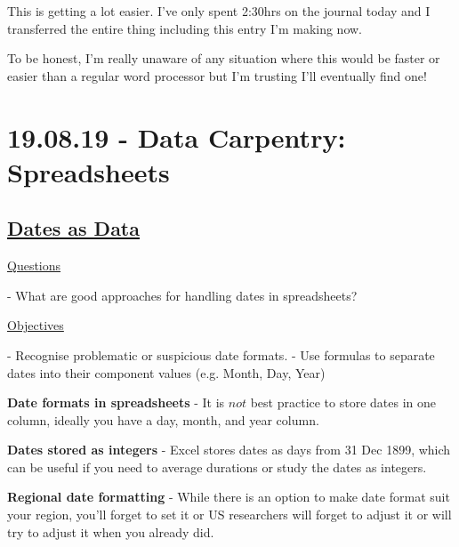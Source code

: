 \documentclass[12pt]{article}
\begin{document}
This is getting a lot easier. I've only spent 2:30hrs on the journal today and I transferred the entire thing including this entry I'm making now.

To be honest, I'm really unaware of any situation where this would be faster or easier than a regular word processor but I'm trusting I'll eventually find one!

\newpage\section{19.08.19 - Data Carpentry: Spreadsheets}

\subsection{\href{https://datacarpentry.org/spreadsheets-socialsci/03-dates-as-data/index.html}{\textbf{Dates as Data}}}

\color{gray}
\underline{Questions}

- What are good approaches for handling dates in spreadsheets?

\underline{Objectives}

- Recognise problematic or suspicious date formats.
\newline - Use formulas to separate dates into their component values (e.g. Month, Day, Year)
\color{black}

\textbf{Date formats in spreadsheets} - It is $not$ best practice to store dates in one column, ideally you have a day, month, and year column.

\textbf{Dates stored as integers} - Excel stores dates as days from 31 Dec 1899, which can be useful if you need to average durations or study the dates as integers.

\textbf{Regional date formatting} - While there is an option to make date format suit your region, you'll forget to set it or US researchers will forget to adjust it or will try to adjust it when you already did.
\end{document}
